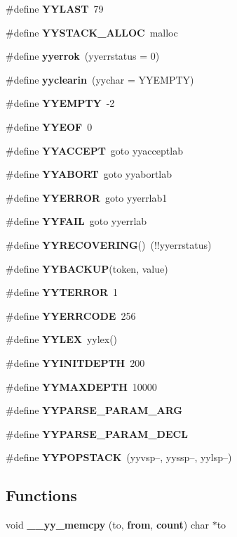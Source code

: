 \begin{CompactItemize}
\item 
\#define {\bf YYLAST}\ 79
\item 
\#define {\bf YYSTACK\_\-ALLOC}\ malloc
\item 
\#define {\bf yyerrok}\ (yyerrstatus = 0)
\item 
\#define {\bf yyclearin}\ (yychar = YYEMPTY)
\item 
\#define {\bf YYEMPTY}\ -2
\item 
\#define {\bf YYEOF}\ 0
\item 
\#define {\bf YYACCEPT}\ goto yyacceptlab
\item 
\#define {\bf YYABORT}\ goto yyabortlab
\item 
\#define {\bf YYERROR}\ goto yyerrlab1
\item 
\#define {\bf YYFAIL}\ goto yyerrlab
\item 
\#define {\bf YYRECOVERING}()\ (!!yyerrstatus)
\item 
\#define {\bf YYBACKUP}(token, value)
\item 
\#define {\bf YYTERROR}\ 1
\item 
\#define {\bf YYERRCODE}\ 256
\item 
\#define {\bf YYLEX}\ yylex()
\item 
\#define {\bf YYINITDEPTH}\ 200
\item 
\#define {\bf YYMAXDEPTH}\ 10000
\item 
\#define {\bf YYPARSE\_\-PARAM\_\-ARG}
\item 
\#define {\bf YYPARSE\_\-PARAM\_\-DECL}
\item 
\#define {\bf YYPOPSTACK}\ (yyvsp--, yyssp--, yylsp--)
\end{CompactItemize}
\subsection*{Functions}
\begin{CompactItemize}
\item 
void {\bf \_\-\_\-yy\_\-memcpy} (to, {\bf from}, {\bf count}) char $\ast$to
\end{CompactItemize}
